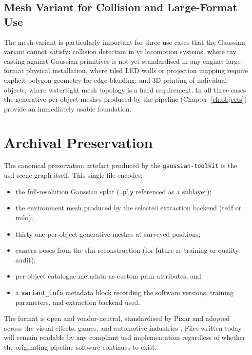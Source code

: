 \subsection{Mesh Variant for Collision and Large-Format Use}

The mesh variant is particularly important for three use cases that the Gaussian
variant cannot satisfy: collision detection in \acrshort{vr} locomotion systems,
where ray casting against Gaussian primitives is not yet standardised in any engine;
large-format physical installation, where tiled LED walls or projection mapping
require explicit polygon geometry for edge blending; and 3D printing of individual
objects, where watertight mesh topology is a hard requirement. In all three cases the
generative per-object meshes produced by the pipeline (Chapter~\ref{ch:objects})
provide an immediately usable foundation.

\section{Archival Preservation}
\label{sec:delivery-archive}

The canonical preservation artefact produced by the \texttt{gaussian-toolkit} is
the \acrshort{usd} scene graph itself. This single file encodes:

\begin{itemize}
  \item the full-resolution Gaussian splat (\texttt{.ply} referenced as a sublayer);
  \item the environment mesh produced by the selected extraction backend
        (\acrshort{tsdf} or \acrshort{milo});
  \item thirty-one per-object generative meshes at surveyed positions;
  \item camera poses from the \acrshort{sfm} reconstruction (for future
        re-training or quality audit);
  \item per-object catalogue metadata as custom prim attributes; and
  \item a \texttt{variant\_info} metadata block recording the software versions,
        training parameters, and extraction backend used.
\end{itemize}

The format is open and vendor-neutral, standardised by Pixar and adopted across the
visual effects, games, and automotive industries \parencite{Pixar2019}. Files written
today will remain readable by any compliant \acrshort{usd} implementation regardless
of whether the originating pipeline software continues to exist.

